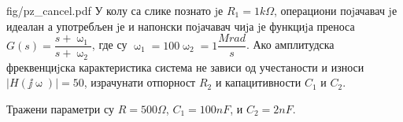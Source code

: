 \begin{slikaDesno}{fig/pz_cancel.pdf}
    \PID
    У колу са слике познато jе $R_1 = 1\unit{k \Omega}$, операциони поjачавач jе идеалан а употребљен jе и напонски 
    поjачавач чиjа jе функциjа преноса $G(s) = \dfrac{s + \upomega_1}{s + \upomega_2}$, где су
    $\upomega_1 = 100 \upomega_2 = 1\unit{\dfrac{Mrad}{s}}$. 
    Ако амплитудска фреквенциjска карактеристика система не зависи од учестаности и износи $|H(\jj\upomega)| = 50$, израчунати отпорност $R_2$
    и капацитивности $C_1$ и $C_2$.
\end{slikaDesno}

\REZULTAT

Тражени параметри су $R = 500 \unit{\Omega}$, $C_1 = 100\unit{nF}$, и $C_2 = 2\unit{nF}$.